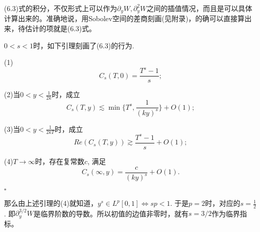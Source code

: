 (6.3)式的积分，不仅形式上可以作为$\partial_yW, \partial_y^2W$之间的插值情况，而且是可以具体计算出来的。准确地说，用Sobolev空间的差商刻画(见附录)，的确可以直接算出来，待估计的项就是(6.3)式。

$0<s<1$时，如下引理刻画了(6.3)的行为.

\begin{lem}\songti\rm

(1)
\[
C_s(T,0)=\frac{T^s-1}{s};
\]

(2)当$0<y<\frac{1}{2k}$时，成立
\[
C_s(T,y)\lesssim\min\{T^s,\frac{1}{(ky)^s}\}+O(1);
\]

(3)当$0<y<\frac{1}{2kT}$时，成立
\[
Re(C_s(T,y))\gtrsim\frac{T^s-1}{s}+O(1);
\]

(4)$T\rightarrow\infty$时，存在复常数$c$, 满足
\[
C_s(\infty,y)=\frac{c}{(ky)^s}+O(1).
\]
\end{lem}

\begin{flushright}
$\square$
\end{flushright}

那么由上述引理的(4)就知道，$y^s\in L^p[0,1]\Leftrightarrow sp<1$. 于是$p=2$时，对应的$s=\frac{1}{2}$. 即$\partial_y^{3/2}W$是临界阶数的导数。所以初值的边值非零时，就有$s=3/2$作为临界指标。